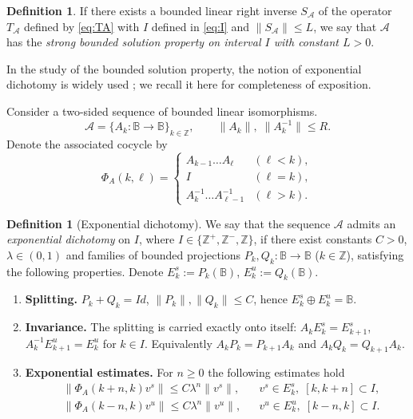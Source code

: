 \documentclass[12pt]{article}
\newcommand{\Bb}{\mathbb{B}}
\newcommand{\Zz}{\mathbb{Z}}
\theoremstyle{definition}
\newtheorem{defin}[thm]{Definition}
\begin{document}
\begin{defin}\label{def:sbs}
If there exists  a bounded linear right inverse $S_{\mathcal{A}}$ of the operator $T_{\mathcal{A}}$ defined by \eqref{eq:TA} with $I$ defined in \eqref{eq:I} and $\|S_{\mathcal{A}}\| \leq L$, we say that $\mathcal{A}$ has the \textit{strong bounded solution property on interval $I$ with constant $L > 0$}. 
\end{defin}


In the study of the bounded solution property, the notion of exponential dichotomy is widely used \cite{BDV2018,ChiconeLatushkin1999,Coppel,Henry94,Maizel1954,
Palmer1988,Slyusarchuk1983}; we recall it here for completeness of exposition.

Consider a two-sided sequence of bounded linear isomorphisms.
$$
\mathcal{A}=\{A_k: \Bb \to \Bb\}_{k\in\mathbb Z}, \qquad 
\|A_k\|,\;\|A_k^{-1}\|\le R.
$$
Denote the associated cocycle by
$$
\Phi_A(k,\ell)=\begin{cases}
 A_{k-1}\dots A_{\ell} & (\ell<k),\\[2pt]
 I & (\ell=k),\\[2pt]
 A_k^{-1}\dots A_{\ell-1}^{-1} & (\ell>k).
 \end{cases}
$$

\begin{defin}[Exponential dichotomy]\label{def:exp-dichotomy}
We say that the sequence $\mathcal{A}$ admits an \emph{exponential dichotomy} on $I$, where $I \in \{\Zz^+, \Zz^-, \Zz\}$, if there exist
constants $C>0$, $\lambda\in(0,1)$ and families of bounded projections
$P_k,Q_k:\Bb \to \Bb$ ($k\in\mathbb Z$), satisfying the following properties. Denote $E^s_k:=P_k(\Bb)$, $E^u_k:=Q_k(\Bb)$.
\begin{enumerate}
    \item[(ED1)] \textbf{Splitting.}  $P_k+Q_k=Id$, 
          $\|P_k\|,\|Q_k\|\le C$,  hence 
          $
          E^s_k\oplus E^u_k = \Bb
          $.
    \item[(ED2)] \textbf{Invariance.}  The splitting is carried exactly
          onto itself: $A_kE^s_k=E^s_{k+1}$, $A_k^{-1}E^u_{k+1}=E^u_{k}$ for $k\in I$.
          Equivalently $A_kP_k=P_{k+1}A_k$ and $A_kQ_k=Q_{k+1}A_k$.
    \item[(ED3)] \textbf{Exponential estimates.}  For $n \geq 0$ the following estimates hold   
          \begin{align*}
             &\|\Phi_A(k+n, k)  v^s\|\le C\lambda^n\|v^s\|,
               && v^s\in E^s_k, \; [k, k+n] \subset I, \\
             &\|\Phi_A(k-n, k) v^u\|\le C\lambda^n\|v^u\|,
               && v^u\in E^u_k, \; [k-n, k] \subset I .
          \end{align*}
\end{enumerate}
\end{defin}
\end{document}
